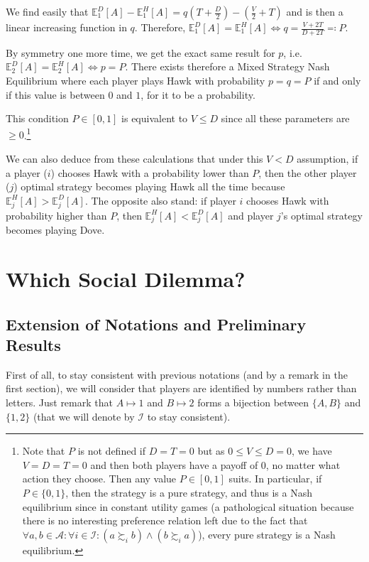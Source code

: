 \documentclass{article}
\newcommand{\E}{\mathbb E}
\begin{document}
We find easily that $\E_1^D[A] - \E_1^H[A] = q\left(T + \frac D2\right) - \left(\frac V2 + T\right)$ and is then
a linear increasing function in $q$. Therefore, $\E_1^D[A] = \E_1^H[A] \iff q = \frac {V+2T}{D+2T} \eqqcolon P$.

By symmetry one more time, we get the exact same result for $p$, i.e. $\E_2^D[A] = \E_2^H[A] \iff p = P$.
There exists therefore a Mixed Strategy Nash Equilibrium where each player plays Hawk with probability
$p = q = P$ if and only if this value is between $0$ and $1$, for it to be a probability.

This condition $P \in [0, 1]$ is equivalent to $V \leq D$ since all these parameters are $\geq 0$.\footnote{Note
that $P$ is not defined if $D=T=0$ but as $0 \leq V \leq D = 0$, we have $V=D=T=0$ and then both players
have a payoff of $0$, no matter what action they choose. Then any value $P \in [0, 1]$ suits.
In particular, if $P \in \{0, 1\}$, then the strategy is a pure strategy, and thus is a Nash equilibrium
since in constant utility games (a pathological situation because there is no interesting preference relation
left due to the fact that $\forall a, b \in \mathcal A : \forall i \in \mathcal I : (a \succsim_i b) \land (b \succsim_i a)$),
every pure strategy is a Nash equilibrium.}

We can also deduce from these calculations that under this $V < D$ assumption, if a player ($i$) chooses Hawk with
a probability lower than $P$, then the other player ($j$) optimal strategy becomes playing Hawk all the time because
$\E_j^H[A] > \E_j^D[A]$. The opposite also stand: if player $i$ chooses Hawk with probability higher than $P$,
then $\E_j^H[A] < \E_j^D[A]$ and player $j$'s optimal strategy becomes playing Dove.

\section{Which Social Dilemma?}
\subsection{Extension of Notations and Preliminary Results}\label{subsec:Social Dilemma Notations}
First of all, to stay consistent with previous notations (and by a remark in the first section), we will
consider that players are identified by numbers rather than letters. Just remark that $A \mapsto 1$ and
$B \mapsto 2$ forms a bijection between $\{A, B\}$ and $\{1, 2\}$ (that we will denote by $\mathcal I$
to stay consistent).
\end{document}
